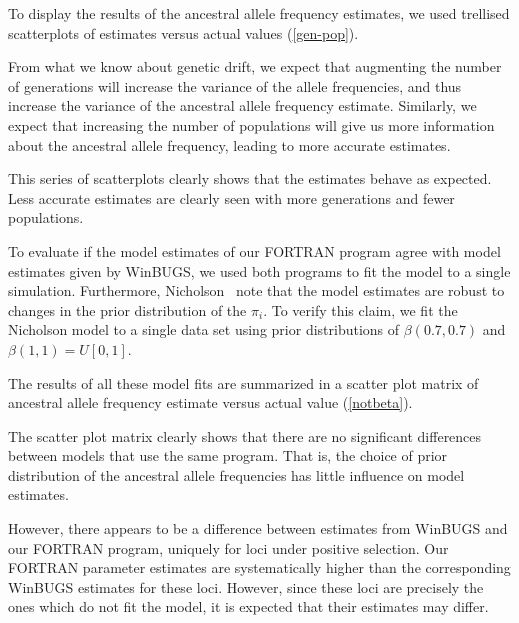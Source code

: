 \documentclass[a4paper,12pt]{article}
\begin{document}
To display the results of the ancestral allele frequency estimates, we
used trellised scatterplots of estimates versus actual values
(\autoref{gen-pop}).


From what we know about genetic drift, we expect that augmenting the
number of generations will increase the variance of the allele
frequencies, and thus increase the variance of the ancestral allele
frequency estimate. Similarly, we expect that increasing the number of
populations will give us more information about the ancestral allele
frequency, leading to more accurate estimates.

This series of scatterplots clearly shows that the estimates behave as
expected. Less accurate estimates are clearly seen with more
generations and fewer populations.

To evaluate if the model estimates of our FORTRAN program agree with
model estimates given by WinBUGS, we used both programs to fit the
model to a single simulation. Furthermore, Nicholson \etal\ note that
the model estimates are robust to changes in the prior distribution of
the $\pi_i$. To verify this claim, we fit the Nicholson model to a
single data set using prior distributions of $\beta(0.7,0.7)$ and
$\beta(1,1)=U[0,1]$.

The results of all these model fits are summarized in a scatter plot
matrix of ancestral allele frequency estimate versus actual value
(\autoref{notbeta}).


The scatter plot matrix clearly shows that there are no significant
differences between models that use the same program. That is, the
choice of prior distribution of the ancestral allele frequencies has
little influence on model estimates.

However, there appears to be a difference between estimates from
WinBUGS and our FORTRAN program, uniquely for loci under positive
selection. Our FORTRAN parameter estimates are systematically higher
than the corresponding WinBUGS estimates for these loci. However,
since these loci are precisely the ones which do not fit the model, it
is expected that their estimates may differ.
\end{document}
